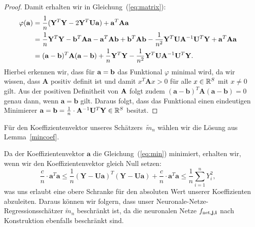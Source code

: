 \begin{proof}
Damit erhalten wir in Gleichung~(\ref{eq:matrix}):
\begin{equation*}
\begin{split}
\varphi(\mathbf{a}) & = \frac{1}{n}(\mathbf{Y}^T\mathbf{Y} - 2\mathbf{Y}^T\mathbf{U}\mathbf{a}) + \mathbf{a}^T \mathbf{A} \mathbf{a} \\
& = \frac{1}{n}\mathbf{Y}^T\mathbf{Y} - \mathbf{b}^T\mathbf{A}\mathbf{a} - \mathbf{a}^T\mathbf{A}\mathbf{b} + \mathbf{b}^T\mathbf{A}\mathbf{b} - \frac{1}{n^2}\mathbf{Y}^T\mathbf{U}\mathbf{A}^{-1}\mathbf{U}^T\mathbf{Y} + \mathbf{a}^T\mathbf{A}\mathbf{a} \\
& = (\mathbf{a} - \mathbf{b})^T \mathbf{A} (\mathbf{a} - \mathbf{b}) + \frac{1}{n}\mathbf{Y}^T\mathbf{Y} - \frac{1}{n^2}\mathbf{Y}^T\mathbf{U}\mathbf{A}^{-1}\mathbf{U}^T\mathbf{Y}.
\end{split} 
\end{equation*} 
Hierbei erkennen wir, dass für $\mathbf{a} = \mathbf{b}$ das Funktional $\varphi$ minimal wird, 
da wir wissen, dass $\mathbf{A}$ positiv definit ist und damit $x^T\mathbf{A}x > 0$ für alle $x \in \mathbb{R}^S$ mit $x \neq 0$ gilt. Aus der positiven Definitheit von $\mathbf{A}$ folgt zudem $(\mathbf{a} - \mathbf{b})^T\mathbf{A}(\mathbf{a} - \mathbf{b}) = 0$ genau dann, wenn $\mathbf{a} = \mathbf{b}$ gilt. Daraus folgt, dass das Funktional einen eindeutigen Minimierer $\mathbf{a} = \mathbf{b} = \frac{1}{n} \cdot \mathbf{A}^{-1}\mathbf{U}^T\mathbf{Y} \in \mathbb{R}^S$ besitzt.
\end{proof}
Für den Koeffizientenvektor unseres Schätzers~$\tilde{m}_n$ wählen wir die Lösung aus Lemma~\ref{mincoef}.
\begin{bemnumber}
\label{mtildebeschraenkt}
Da der Koeffizientenvektor $\mathbf{a}$ die Gleichung~(\ref{eq:min}) minimiert, erhalten wir, wenn wir den Koeffizientenvektor gleich Null setzen:
$$\frac{c}{n} \cdot \mathbf{a}^T\mathbf{a} \leq \frac{1}{n}(\mathbf{Y} - \mathbf{U}\mathbf{a})^T(\mathbf{Y} - \mathbf{U}\mathbf{a}) + \frac{c}{n} \cdot \mathbf{a}^T\mathbf{a} \leq \frac{1}{n} \sum_{i = 1}^n Y_i^2,$$
was uns erlaubt eine obere Schranke für den absoluten Wert unserer Koeffizienten abzuleiten. Daraus können wir folgern, dass unser Neuronale-Netze-Regressionsschätzer $\tilde{m}_n$ beschränkt ist, da die neuronalen Netze $f_{\mathrm{net},\mathbf{j},\mathbf{i}}$ nach Konstruktion ebenfalls beschränkt sind.
\end{bemnumber}